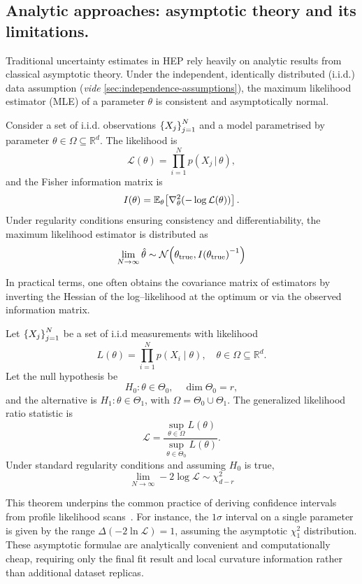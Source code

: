     \subsection{Analytic approaches: asymptotic theory and its limitations.}
        Traditional uncertainty estimates in HEP rely heavily on analytic results from classical asymptotic theory.
        Under the independent, identically distributed (i.i.d.) data assumption (\textit{vide} \cref{sec:independence-assumptions}), the maximum likelihood estimator (MLE) of a parameter $\theta$ is consistent and asymptotically normal.
\begin{theorem}
    Consider a set of i.i.d. observations \(\qty{X_j}_{j = 1}^N\) and a model parametrised by parameter \(\theta\in\Omega\subseteq\mathbb{R}^{d}\). The likelihood is
    \[
        \mathcal L(\theta) =\prod_{i=1}^{N} p(X_{j}\, | \,\theta),
    \] and the Fisher information matrix is
    \[
        I(\theta) =\mathbb{E}_{\theta}\qty[\laplacian_{\theta}(-\log\mathcal L(\theta))]\,.
    \]
Under regularity conditions ensuring consistency and differentiability,
the maximum likelihood estimator is distributed as
\[
    \lim_{N\to\infty} \hat\theta \sim \mathcal N\qty(\theta_{\text{true}}, I\qty(\theta_{\text{true}})^{-1})
\]
\end{theorem}
        
        In practical terms, one often obtains the covariance matrix of estimators by inverting the Hessian of the log--likelihood at the optimum or via the observed information matrix.
        
\begin{theorem}
    Let \(\qty{X_j}_{j=1}^N\) be a set of i.i.d measurements with likelihood
    \[
        L(\theta)=\prod_{i=1}^{N}p(X_{i}\mid\theta), \quad \theta\in\Omega\subseteq\mathbb{R}^{d}.
    \]
    Let the null hypothesis be
    \[
        H_{0}:\theta\in\Theta_{0},\quad \dim\Theta_{0}=r,
    \]
    and the alternative is \(H_{1}:\theta\in\Theta_{1}\), with \(\Omega=\Theta_{0}\cup\Theta_{1}\). The generalized likelihood ratio statistic is
    \[
        \mathcal L = \frac{\sup_{\theta\in\Omega}L(\theta)}
            {\sup_{\theta\in\Theta_{0}}L(\theta)}.
    \]
    Under standard regularity conditions and assuming \(H_{0}\) is true, 
    \[
        \lim_{N\to\infty} -2\log \mathcal L \sim\chi^2_{d-r}
    \]
\end{theorem}
        This theorem underpins the common practice of deriving confidence intervals from profile likelihood scans~\cite{Cowan:2010js, Algeri:2019lah, Canonero:2023sua, Frate:2017mai, Ansarifard:2025hec}.
        For instance, the $1\sigma$ interval on a single parameter is given by the range $\Delta(-2\ln\mathcal{L}) = 1$, assuming the asymptotic $\chi^2_1$ distribution.
        These asymptotic formulae are analytically convenient and computationally cheap, requiring only the final fit result and local curvature information rather than additional dataset replicas.

